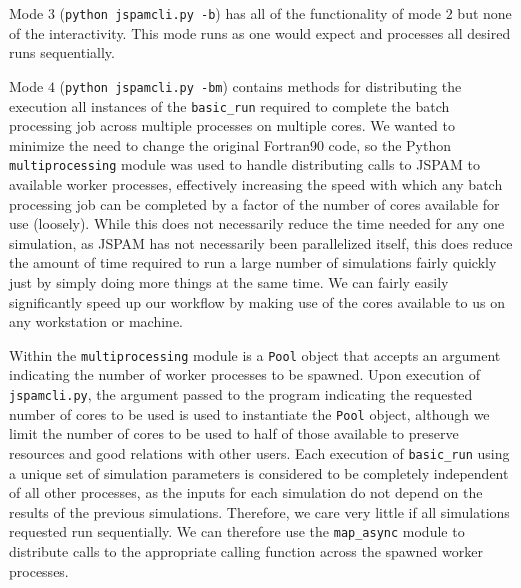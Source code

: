 Mode $3$ (\texttt{python jspamcli.py -b}) has all of the functionality of
mode $2$ but none of the interactivity.
This mode runs as one would expect and processes all desired runs sequentially.

Mode $4$ (\texttt{python jspamcli.py -bm})
contains methods for distributing the execution all instances of the
\texttt{basic\_run} required to complete the batch processing job across
multiple processes on multiple cores.
We wanted to minimize the need to change the original Fortran90 code, so the
Python \texttt{multiprocessing} module was used to handle distributing calls
to JSPAM to available worker processes, effectively increasing the speed with
which any batch processing job can be completed by a factor of the number of
cores available for use (loosely).
While this does not necessarily reduce the time needed for any one simulation,
as JSPAM has not necessarily been parallelized itself,
this does reduce the amount of time
required to run a large number of simulations fairly quickly just by simply
doing more things at the same time. We can fairly easily significantly
speed up our workflow by making use of the cores available to us on any
workstation or machine.

Within the \texttt{multiprocessing} module is a \texttt{Pool} object that
accepts an argument indicating the number of worker processes to be spawned.
Upon execution of \texttt{jspamcli.py}, the argument passed to the program
indicating the requested number of cores to be used is used to instantiate the
\texttt{Pool} object, although we limit the number of cores to be used to half
of those available to preserve resources and good relations with other users.
Each execution of \texttt{basic\_run} using a
unique set of simulation parameters is considered to be completely
independent of all other processes, as the inputs for each simulation do not
depend on the results of the previous simulations. Therefore, we care very
little if all simulations requested run sequentially. We can therefore use the
\texttt{map\_async} module to distribute calls to the appropriate calling
function across the spawned worker processes.

